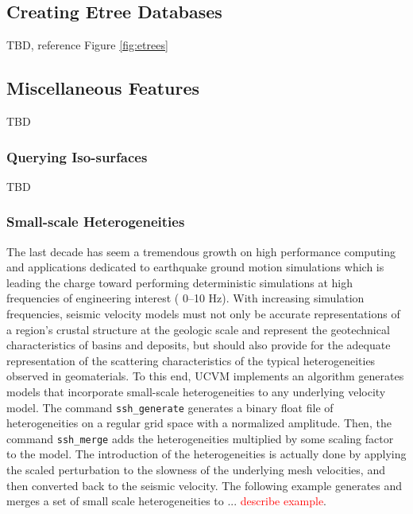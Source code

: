 

\subsection{Creating Etree Databases}

TBD, reference Figure \ref{fig:etrees}

\subsection{Miscellaneous Features}

TBD

\subsubsection{Querying Iso-surfaces}

TBD 


\subsubsection{Small-scale Heterogeneities}

The last decade has seem a tremendous growth on high performance computing and applications dedicated to earthquake ground motion simulations which is leading the charge toward performing deterministic simulations at high frequencies of engineering interest (\fmax{} 0--10 Hz). With increasing simulation frequencies, seismic velocity models must not only be accurate representations of a region's crustal structure at the geologic scale and represent the geotechnical characteristics of basins and deposits, but should also provide for the adequate representation of the scattering characteristics of the typical heterogeneities observed in geomaterials. To this end, UCVM implements an algorithm generates models that incorporate small-scale heterogeneities to any underlying velocity model. The command \texttt{ssh\_generate} generates a binary float file of heterogeneities on a regular grid space with a normalized amplitude. Then, the command \texttt{ssh\_merge} adds the heterogeneities multiplied by some scaling factor to the model. The introduction of the heterogeneities is actually done by applying the scaled perturbation to the slowness of the underlying mesh velocities, and then converted back to the seismic velocity. The following example generates and merges a set of small scale heterogeneities to ... \textcolor{red}{describe example}.

